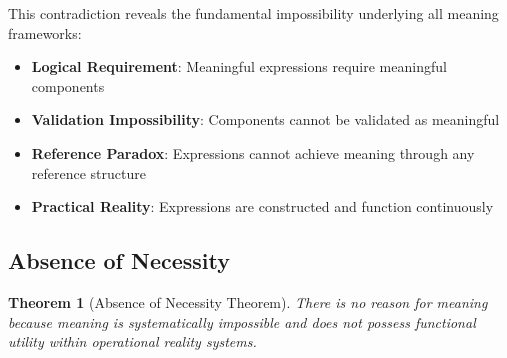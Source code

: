 \documentclass[12pt,a4paper]{article}
\newtheorem{theorem}{Theorem}[section]
\begin{document}
This contradiction reveals the fundamental impossibility underlying all meaning frameworks:

\begin{itemize}
\item \textbf{Logical Requirement}: Meaningful expressions require meaningful components
\item \textbf{Validation Impossibility}: Components cannot be validated as meaningful  
\item \textbf{Reference Paradox}: Expressions cannot achieve meaning through any reference structure
\item \textbf{Practical Reality}: Expressions are constructed and function continuously
\end{itemize}

\subsection{Absence of Necessity}

\begin{theorem}[Absence of Necessity Theorem]
There is no reason for meaning because meaning is systematically impossible and does not possess functional utility within operational reality systems.
\end{theorem}
\end{document}
